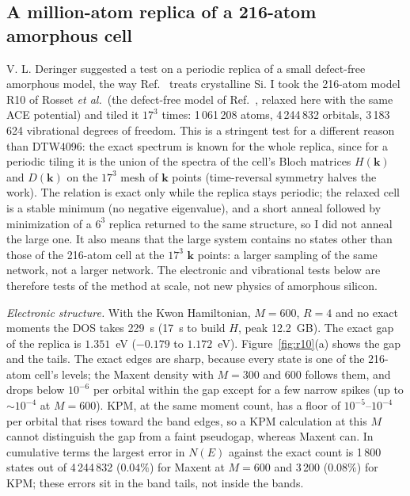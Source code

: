 \documentclass[reprint,nofootinbib,superscriptaddress,amsmath,amssymb,aps,prb,floatfix]{revtex4-2}
\begin{document}
\subsection{A million-atom replica of a 216-atom amorphous cell}
\label{sec:app_r10}

V. L. Deringer suggested a test on a periodic replica of a small defect-free amorphous model, the way Ref.~\cite{deringer} treats crystalline Si. I took the 216-atom model R10 of Rosset \emph{et al.}\ (the defect-free model of Ref.~\cite{rosset2026}, relaxed here with the same ACE potential) and tiled it $17^3$ times: 1\,061\,208 atoms, 4\,244\,832 orbitals, 3\,183\,624 vibrational degrees of freedom.
This is a stringent test for a different reason than DTW4096: the exact spectrum is known for the whole replica, since for a periodic tiling it is the union of the spectra of the cell's Bloch matrices $H(\mathbf k)$ and $D(\mathbf k)$ on the $17^3$ mesh of $\mathbf k$ points (time-reversal symmetry halves the work).
The relation is exact only while the replica stays periodic; the relaxed cell is a stable minimum (no negative eigenvalue), and a short anneal followed by minimization of a $6^3$ replica returned to the same structure, so I did not anneal the large one.
It also means that the large system contains no states other than those of the 216-atom cell at the $17^3$ $\mathbf k$ points: a larger sampling of the same network, not a larger network.
The electronic and vibrational tests below are therefore tests of the method at scale, not new physics of amorphous silicon.

\emph{Electronic structure.} With the Kwon Hamiltonian, $M=600$, $R=4$ and no exact moments the DOS takes 229~s (17~s to build $H$, peak 12.2~GB). The exact gap of the replica is $1.351$~eV ($-0.179$ to $1.172$~eV).
Figure~\ref{fig:r10}(a) shows the gap and the tails. The exact edges are sharp, because every state is one of the 216-atom cell's levels; the Maxent density with $M=300$ and 600 follows them, and drops below $10^{-6}$ per orbital within the gap except for a few narrow spikes (up to $\sim10^{-4}$ at $M=600$). KPM, at the same moment count, has a floor of $10^{-5}$--$10^{-4}$ per orbital that rises toward the band edges, so a KPM calculation at this $M$ cannot distinguish the gap from a faint pseudogap, whereas Maxent can.
In cumulative terms the largest error in $N(E)$ against the exact count is 1\,800 states out of 4\,244\,832 ($0.04\%$) for Maxent at $M=600$ and 3\,200 ($0.08\%$) for KPM; these errors sit in the band tails, not inside the bands.
\end{document}

